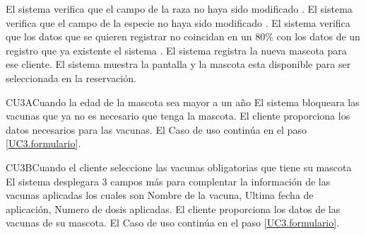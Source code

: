 \begin{UCtrayectoria}
\UCpaso[\UCsist] \label{UC3.verificacion raza} El sistema verifica que el campo de la raza no haya sido modificado .
\UCpaso[\UCsist] \label{UC3.verificacion especie} El sistema verifica que el campo de la especie no haya sido modificado .
\UCpaso[\UCsist] \label{UC3.verificacion duplicidad de datos} El sistema verifica que los datos que se quieren registrar no coincidan en un 80\% con los datos de un registro que ya existente el sistema .
\UCpaso[\UCsist] \label{UC3.registrar} El sistema registra la nueva mascota para ese cliente.
\UCpaso[\UCsist] \label{UC3.seleccionar mascota} El sistema muestra la pantalla  y la mascota esta disponible para ser seleccionada en la reservación.
	
\end{UCtrayectoria}


\begin{UCtrayectoriaA}{CU3}{A}{Cuando la edad de la mascota sea mayor a un año}
	\UCpaso[\UCsist] El sistema bloqueara las vacunas que ya no es necesario que tenga la mascota.
	\UCpaso[\UCactor] El cliente proporciona los datos necesarios para las vacunas.
	\UCpaso[] El Caso de uso continúa en el paso \ref{UC3.formulario}.
\end{UCtrayectoriaA}

\begin{UCtrayectoriaA}{CU3}{B}{Cuando el cliente seleccione las vacunas obligatorias que tiene su mascota}
	\UCpaso [\UCsist]El sistema desplegara 3 campos más para complentar la información de las vacunas aplicadas los cuales son Nombre de la vacuna, Ultima fecha de aplicación, Numero de dosis aplicadas.
	\UCpaso [\UCactor]El cliente proporciona los datos de las vacunas de su mascota.
	\UCpaso[] El Caso de uso continúa en el paso \ref{UC3.formulario}.
\end{UCtrayectoriaA}

